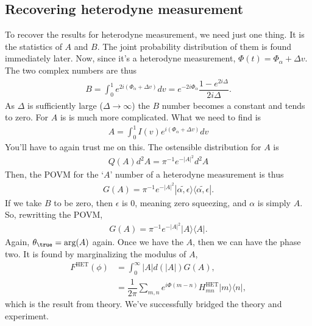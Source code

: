 \documentclass{article}
\begin{document}
\subsection{Recovering heterodyne measurement}
To recover the results for heterodyne measurement, we need just one thing. It is the statistics of $A$ and $B$. The joint probability distribution of them is found immediately later. Now, since it's a heterodyne measurement, $\Phi(t)=\Phi_\alpha+\Delta v$. The two complex numbers are thus
\begin{align}
    B = \int_{0}^{1} e^{2i(\Phi_\alpha+\Delta v)}dv = e^{-2i\Phi_\alpha}\dfrac{1-e^{2i\Delta}}{2i\Delta}.
\end{align}
As $\Delta$ is sufficiently large ($\Delta\to\infty$) the $B$ number becomes a constant and tends to zero. For $A$ is is much more complicated. What we need to find is
\begin{align}
    A = \int_{0}^{1} I(v)e^{i(\Phi_\alpha+\Delta v)}dv 
\end{align}
You'll have to again trust me on this. The ostensible distribution for $A$ is 
\begin{align}
    Q(A)d^2A = \pi^{-1}e^{-|A|^2} d^2A
\end{align}
Then, the POVM for the `$A$' number of a heterodyne measurement is thus
\begin{align}
    G(A) = \pi^{-1}e^{-|A|^2}|\tilde{\alpha,\epsilon}\rangle\langle\tilde{\alpha,\epsilon}|.
\end{align}
If we take $B$ to be zero, then $\epsilon$ is 0, meaning zero squeezing, and $\alpha$ is simply $A$. So, rewritting the POVM,
\begin{align}
    G(A) = \pi^{-1}e^{-|A|^2}|A\rangle\langle A|.
\end{align}
Again, $\theta_{\true}=\text{arg}(A)$ again. Once we have the $A$, then we can have the phase two. It is found by marginalizing the modulus of $A$,
\begin{align}
    F^{\text{HET}}(\phi) &= \int_0^\infty |A|d(|A|)G(A),\\
    &=\dfrac{1}{2\pi}\sum_{m,n}e^{i\Phi(m-n)}H^{\text{HET}}_{mn}|m\rangle\langle n|,
\end{align}
which is the result from theory. We've successfully bridged the theory and experiment.
% 
\end{document}
